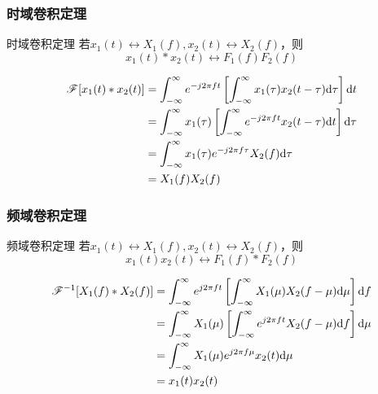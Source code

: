     \subsubsection{时域卷积定理}
    \begin{mythm}{时域卷积定理}\label{thm:tconv}
        若$x_1(t)\leftrightarrow X_1(f),x_2(t)\leftrightarrow X_2(f)$，则
        \begin{equation}
            x_1(t)*x_2(t)\leftrightarrow F_1(f)F_2(f)
        \end{equation}
    \end{mythm}
    \Proof
    \begin{equation*}
        \begin{split}
            \mathscr{F}[x_1(t)*x_2(t)] &=\int_{-\infty}^{\infty}e^{-j2\pi ft}\left[\int_{-\infty}^{\infty}x_1(\tau)x_2(t-\tau)\text{\upshape d} \tau\right]\text{\upshape d} t\\
                                       &=\int_{-\infty}^{\infty}x_1(\tau)\left[\int_{-\infty}^{\infty}e^{-j2\pi ft}x_2(t-\tau)\text{\upshape d} t\right]\text{\upshape d} \tau\\
                                       &=\int_{-\infty}^{\infty}x_1(\tau)e^{-j2\pi f\tau}X_2(f)\text{\upshape d}\tau\\
                                       &=X_1(f)X_2(f)
        \end{split}
    \end{equation*}

    \subsubsection{频域卷积定理}
    \begin{mythm}{频域卷积定理}\label{thm:fconv}
        若$x_1(t)\leftrightarrow X_1(f),x_2(t)\leftrightarrow X_2(f)$，则
        \begin{equation}
            x_1(t)x_2(t)\leftrightarrow F_1(f)*F_2(f)
        \end{equation}
    \end{mythm}
    \Proof
    \begin{equation*}
        \begin{split}
            \mathscr{F}^{-1}[X_1(f)*X_2(f)] &=\int_{-\infty}^{\infty}e^{j2\pi ft}\left[\int_{-\infty}^{\infty}X_1(\mu)X_2(f-\mu)\text{\upshape d} \mu\right]\text{\upshape d} f\\
                                            &=\int_{-\infty}^{\infty}X_1(\mu)\left[\int_{-\infty}^{\infty}e^{j2\pi ft}X_2(f-\mu)\text{\upshape d} f\right]\text{\upshape d} \mu\\
                                            &=\int_{-\infty}^{\infty}X_1(\mu)e^{j2\pi f\mu}x_2(t)\text{\upshape d}\mu\\
                                            &=x_1(t)x_2(t)
        \end{split}
    \end{equation*}

